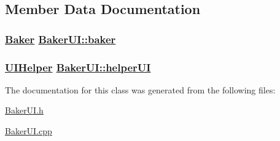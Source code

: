 \subsection{Member Data Documentation}
\hypertarget{class_baker_u_i_623466d63908ff643b88d946e2f2fbd6}{
\subsubsection[baker]{\setlength{\rightskip}{0pt plus 5cm}\hyperlink{class_baker}{Baker} \hyperlink{class_baker_u_i_623466d63908ff643b88d946e2f2fbd6}{Baker\-UI::baker}}}
\label{class_baker_u_i_623466d63908ff643b88d946e2f2fbd6}


\hypertarget{class_baker_u_i_165ca02db075e280199e0970e3465900}{
\subsubsection[helperUI]{\setlength{\rightskip}{0pt plus 5cm}\hyperlink{class_u_i_helper}{UIHelper} \hyperlink{class_baker_u_i_165ca02db075e280199e0970e3465900}{Baker\-UI::helper\-UI}}}
\label{class_baker_u_i_165ca02db075e280199e0970e3465900}




The documentation for this class was generated from the following files:\begin{CompactItemize}
\item 
\hyperlink{_baker_u_i_8h}{Baker\-UI.h}\item 
\hyperlink{_baker_u_i_8cpp}{Baker\-UI.cpp}\end{CompactItemize}
